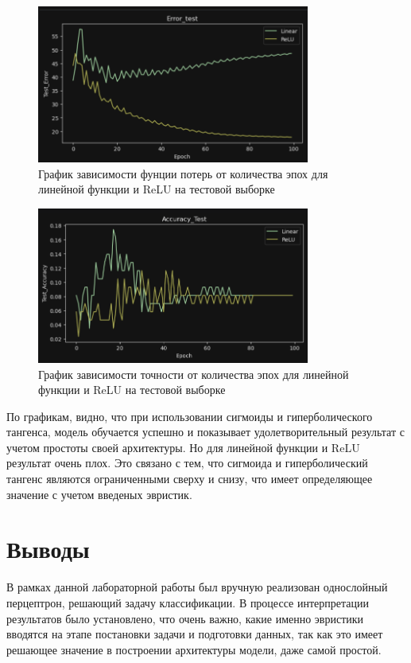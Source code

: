 \documentclass[a4paper, 14pt]{extarticle}
\begin{document}
\begin{figure}[H]
\centering
\includegraphics[width=0.8\textwidth]{images/res7.png}
\caption{График зависимости фунции потерь от количества эпох для линейной функции и ReLU на тестовой выборке}
\label{fig:img7}
\end{figure}


\begin{figure}[H]
\centering
\includegraphics[width=0.8\textwidth]{images/res8.png}
\caption{График зависимости точности от количества эпох для линейной функции и ReLU на тестовой выборке}
\label{fig:img8}
\end{figure}

По графикам, видно, что при использовании сигмоиды и гиперболического тангенса, модель обучается успешно и показывает удолетворительный результат с учетом простоты своей архитектуры. Но для линейной функции и ReLU результат очень плох. Это связано с тем, что сигмоида и гиперболический тангенс являются ограниченными сверху и снизу, что имеет определяющее значение с учетом введеных эвристик.

\section{Выводы}
В рамках данной лабораторной работы был вручную реализован однослойный перцептрон, решающий задачу классификации. В процессе интерпретации результатов было установлено, что очень важно, какие именно эвристики вводятся на этапе постановки задачи и подготовки данных, так как это имеет решающее значение в построении архитектуры модели, даже самой простой.
\end{document}
